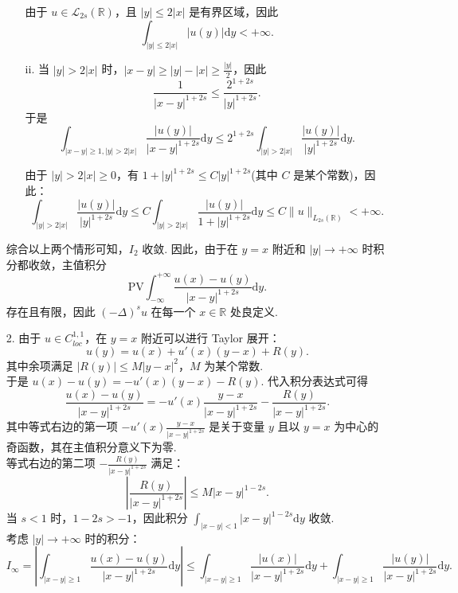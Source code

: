 \begin{solution}
\begin{enumerate}
\begin{enumerate}
        由于 $u \in \mathcal{L}_{2s}(\mathbb{R})$，且 $|y| \leq 2|x|$ 是有界区域，因此
        \[
        \int_{|y| \leq 2|x|} |u(y)| \mathrm{d}y < +\infty.
        \]

        \item[ii.] 当 $|y| > 2|x|$ 时，$\displaystyle |x-y| \geq |y| - |x| \geq \frac{|y|}{2}$，因此
        \[
        \frac{1}{|x-y|^{1+2s}} \leq \frac{2^{1+2s}}{|y|^{1+2s}}.
        \]
        于是
        \[
        \int_{|x-y|\geq 1, |y| > 2|x|} \frac{|u(y)|}{|x-y|^{1+2s}} \mathrm{d}y \leq 2^{1+2s} \int_{|y| > 2|x|} \frac{|u(y)|}{|y|^{1+2s}} \mathrm{d}y.
        \]

        由于 $|y| > 2|x| \geq 0$，有 $1 + |y|^{1+2s} \leq C |y|^{1+2s}$(其中 $C$ 是某个常数)，因此：
        \[
        \int_{|y| > 2|x|} \frac{|u(y)|}{|y|^{1+2s}} \mathrm{d}y \leq C \int_{|y| > 2|x|} \frac{|u(y)|}{1 + |y|^{1+2s}} \mathrm{d}y \leq C \|u\|_{L_{2s}(\mathbb{R})} < +\infty.
        \]    
        \end{enumerate}
        综合以上两个情形可知，$I_2$ 收敛.
        因此，由于在 $y = x$ 附近和 $|y| \to +\infty$ 时积分都收敛，主值积分 
        \[
        \mathrm{PV} \int_{-\infty}^{+\infty} \frac{u(x) - u(y)}{|x-y|^{1+2s}} \mathrm{d}y.
        \]
        存在且有限，因此 $(-\Delta)^s u$ 在每一个 $x \in \mathbb{R}$ 处良定义. 
        \item[2.]
        由于 $u \in C_{loc}^{1,1}$，在 $y = x$ 附近可以进行 Taylor 展开：
        \[
        u(y) = u(x) + u'(x)(y-x) + R(y).
        \]
        其中余项满足 $|R(y)| \leq M |y-x|^2$，$M$ 为某个常数.\\
        于是 $\displaystyle u(x) - u(y) = -u'(x)(y-x) - R(y)$.
        代入积分表达式可得
        \[
        \frac{u(x) - u(y)}{|x-y|^{1+2s}} = -u'(x) \frac{y-x}{|x-y|^{1+2s}} - \frac{R(y)}{|x-y|^{1+2s}}.
        \]
        其中等式右边的第一项 $\displaystyle -u'(x) \frac{y-x}{|x-y|^{1+2s}}$ 是关于变量 $y$ 且以 $y = x$ 为中心的奇函数，其在主值积分意义下为零.\\
        等式右边的第二项 $\displaystyle -\frac{R(y)}{|x-y|^{1+2s}}$ 满足：
        \[
        \left| \frac{R(y)}{|x-y|^{1+2s}} \right| \leq M |x-y|^{1-2s}.
        \]
        当 $s < 1$ 时，$1-2s > -1$，因此积分 $\displaystyle \int_{|x-y|<1} |x-y|^{1-2s} \mathrm{d}y$ 收敛.\\
        考虑 $|y| \to +\infty$ 时的积分：
        \[
        I_{\infty} = \left| \int_{|x-y|\geq 1} \frac{u(x) - u(y)}{|x-y|^{1+2s}} \mathrm{d}y \right| \leq \int_{|x-y|\geq 1} \frac{|u(x)|}{|x-y|^{1+2s}} \mathrm{d}y + \int_{|x-y|\geq 1} \frac{|u(y)|}{|x-y|^{1+2s}} \mathrm{d}y.
\]
\end{enumerate}
\end{solution}
